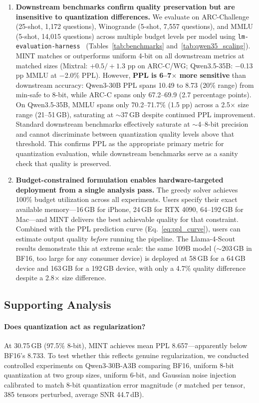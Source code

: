 \documentclass{article}
\begin{document}
\begin{enumerate}
\item \textbf{Downstream benchmarks confirm quality preservation but are insensitive to quantization differences.}
We evaluate on ARC-Challenge (25-shot, 1{,}172 questions), Winogrande (5-shot, 7{,}557 questions), and MMLU (5-shot, 14{,}015 questions) across multiple budget levels per model using \texttt{lm-evaluation-harness}~\cite{eval-harness} (Tables~\ref{tab:benchmarks} and~\ref{tab:qwen35_scaling}). MINT matches or outperforms uniform 4-bit on all downstream metrics at matched sizes (Mixtral: $+0.5/+1.3$ pp on ARC-C/WG; Qwen3.5-35B: $-$0.13 pp MMLU at $-$2.0\% PPL). However, \textbf{PPL is 6--7$\times$ more sensitive} than downstream accuracy: Qwen3-30B PPL spans 10.49 to 8.73 (20\% range) from min-safe to 8-bit, while ARC-C spans only 67.2--69.9 (2.7 percentage points). On Qwen3.5-35B, MMLU spans only 70.2--71.7\% (1.5 pp) across a 2.5$\times$ size range (21--51\,GB), saturating at ${\sim}$37\,GB despite continued PPL improvement. Standard downstream benchmarks effectively saturate at ${\sim}$4--8-bit precision and cannot discriminate between quantization quality levels above that threshold. This confirms PPL as the appropriate primary metric for quantization evaluation, while downstream benchmarks serve as a sanity check that quality is preserved.

\item \textbf{Budget-constrained formulation enables hardware-targeted deployment from a single analysis pass.}
The greedy solver achieves 100\% budget utilization across all experiments. Users specify their exact available memory---16\,GB for iPhone, 24\,GB for RTX 4090, 64--192\,GB for Mac---and MINT delivers the best achievable quality for that constraint. Combined with the PPL prediction curve (Eq.~\ref{eq:ppl_curve}), users can estimate output quality \emph{before} running the pipeline. The Llama-4-Scout results demonstrate this at extreme scale: the same 109B model (${\sim}$203\,GB in BF16, too large for any consumer device) is deployed at 58\,GB for a 64\,GB device and 163\,GB for a 192\,GB device, with only a 4.7\% quality difference despite a 2.8$\times$ size difference.

\end{enumerate}

\subsection{Supporting Analysis}

\paragraph{Does quantization act as regularization?}
\label{sec:quant_noise}
At 30.75\,GB (97.5\% 8-bit), MINT achieves mean PPL 8.657---apparently below BF16's 8.733. To test whether this reflects genuine regularization, we conducted controlled experiments on Qwen3-30B-A3B comparing BF16, uniform 8-bit quantization at two group sizes, uniform 6-bit, and Gaussian noise injection calibrated to match 8-bit quantization error magnitude ($\sigma$ matched per tensor, 385 tensors perturbed, average SNR 44.7\,dB).
\end{document}
